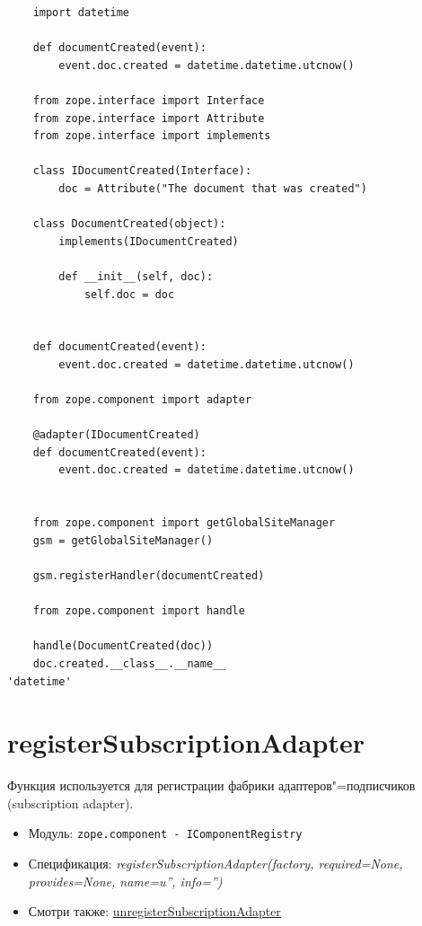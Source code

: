 \documentclass[a4paper,openany,twoside,draft]{book}
\providecommand*{\DUroletitlereference}[1]{\textsl{#1}}
\begin{document}
\begin{verbatim}
    import datetime

    def documentCreated(event):
        event.doc.created = datetime.datetime.utcnow()

    from zope.interface import Interface
    from zope.interface import Attribute
    from zope.interface import implements

    class IDocumentCreated(Interface):
        doc = Attribute("The document that was created")

    class DocumentCreated(object):
        implements(IDocumentCreated)

        def __init__(self, doc):
            self.doc = doc


    def documentCreated(event):
        event.doc.created = datetime.datetime.utcnow()

    from zope.component import adapter

    @adapter(IDocumentCreated)
    def documentCreated(event):
        event.doc.created = datetime.datetime.utcnow()


    from zope.component import getGlobalSiteManager
    gsm = getGlobalSiteManager()

    gsm.registerHandler(documentCreated)

    from zope.component import handle

    handle(DocumentCreated(doc))
    doc.created.__class__.__name__
'datetime'
\end{verbatim}


\section*{registerSubscriptionAdapter%
  \label{registersubscriptionadapter}%
}

Функция используется для регистрации фабрики адаптеров"=подписчиков (subscription adapter).

\begin{itemize}

\item Модуль: \texttt{zope.component - IComponentRegistry}

\item Спецификация: \DUroletitlereference{registerSubscriptionAdapter(factory, required=None, provides=None, name=u'', info='')}

\item Смотри также: \hyperref[unregistersubscriptionadapter]{unregisterSubscriptionAdapter}

\end{itemize}
\end{document}
